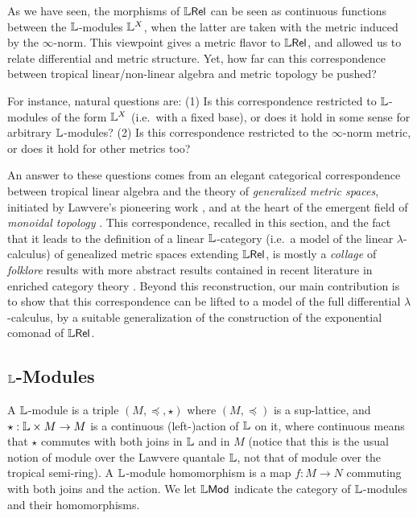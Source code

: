 

As we have seen, the morphisms of $\mathbb{L} \mathsf{Rel}$ can be seen as continuous functions between the $\mathbb{L}$-modules $\mathbb{L}^{X}$, when the latter are taken with the metric induced by the $\infty$-norm. This viewpoint gives a metric flavor to $\mathbb{L} \mathsf{Rel}$, and allowed us to relate differential and metric structure. Yet, how far can this correspondence between tropical linear/non-linear algebra and metric topology be pushed?

For instance, natural questions are: (1) Is this correspondence restricted to $\mathbb{L}$-modules of the form $\mathbb{L}^{X}$ (i.e.~with a fixed base), or does it hold in some sense for arbitrary $\mathbb{L}$-modules? (2) Is this correspondence restricted to the $\infty$-norm metric, or does it hold for other metrics too?

An answer to these questions comes from an elegant categorical correspondence between tropical linear algebra and the theory of \emph{generalized metric spaces}, initiated by Lawvere's pioneering work \cite{Lawvere1973}, and at the heart of the emergent field of \emph{monoidal topology} \cite{}. 
This correspondence, recalled in this section, and the fact that it leads to the definition of a linear $\mathbb{L}$-category (i.e.~a model of the linear $\lambda$-calculus) of genealized metric spaces extending $\mathbb{L} \mathsf{Rel}$, is mostly a \emph{collage} of  \emph{folklore} results with more abstract results contained in recent literature in enriched category theory \cite{}.
Beyond this reconstruction, our main contribution is to show that this correspondence can be lifted to a model of the full differential $\lambda$-calculus, by a suitable generalization of the construction of the exponential comonad of $\mathbb{L} \mathsf{Rel}$.

%
%

\subsection{$\mathbb{L}$-Modules}


A $\mathbb{L}$-module is a triple $(M,\preceq, \star)$ where $(M, \preceq)$ is a sup-lattice, and $\star: \mathbb{L} \times M \to M$ is a continuous (left-)action of $\mathbb{L}$ on it, where continuous means that $\star$ commutes with both joins in $\mathbb{L}$ and in $M$ (notice that this is the usual notion of module over the Lawvere quantale $\mathbb{L}$, not that of module over the tropical semi-ring).
A $\mathbb{L}$-module homomorphism is a map $f:M\to N$ commuting with both joins and the action. We let $\mathbb{L}\mathsf{Mod}$ indicate the category of $\mathbb{L}$-modules and their homomorphisms. 
 
